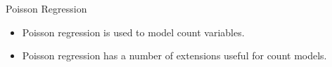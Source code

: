 \documentclass[00-GLMregslides.tex]{subfiles}
\begin{document}
%
 
\begin{frame}
	
	{\Large
		Poisson Regression
	}
	\begin{itemize}
		\item Poisson regression is used to model count variables.
		\item Poisson regression has a number of extensions useful for count models.

	\end{itemize}
\end{frame}
\end{document}

